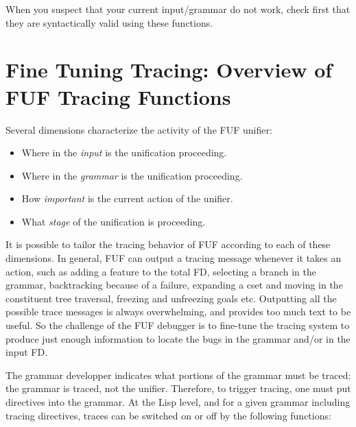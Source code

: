 \documentclass[10pt,a4paper]{report}
\begin{document}
When you suspect that your current input/grammar do not work, check first
that they are syntactically valid using these functions.


\section{Fine Tuning Tracing: Overview of FUF Tracing Functions}

Several dimensions characterize the activity of the FUF unifier:
\begin{itemize}
\item Where in the {\em input} is the unification proceeding.

\item Where in the {\em grammar} is the unification proceeding.

\item How {\em important} is the current action of the unifier.

\item What {\em stage} of the unification is proceeding.
\end{itemize}

It is possible to tailor the tracing behavior of FUF according to each of
these dimensions.  In general, FUF can output a tracing message whenever it
takes an action, such as adding a feature to the total FD, selecting a
branch in the grammar, backtracking because of a failure, expanding a cset
and moving in the constituent tree traversal, freezing and unfreezing
goals etc.  Outputting all the possible trace messages is always
overwhelming, and provides too much text to be useful.  So the challenge of
the FUF debugger is to fine-tune the tracing system to produce just enough
information to locate the bugs in the grammar and/or in the input FD.

The grammar developper indicates what portions of the grammar must be
traced: the grammar is traced, not the unifier. Therefore, to trigger
tracing, one must put directives into the grammar. At the Lisp level, and
for a given grammar including tracing directives, traces can be switched on
or off by the following functions:
\end{document}
